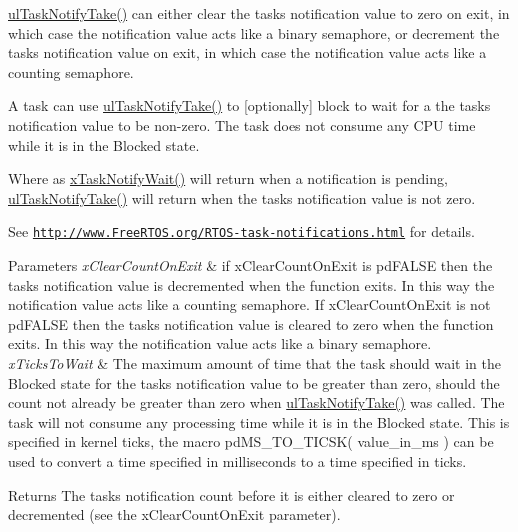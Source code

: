 \hyperlink{vendor_2ceedling_2plugins_2freertos_2src_2freertos_2include_2task_8h_a66540bef602522a01a519f776e4c07d8}{ul\+Task\+Notify\+Take()} can either clear the task\textquotesingle{}s notification value to zero on exit, in which case the notification value acts like a binary semaphore, or decrement the task\textquotesingle{}s notification value on exit, in which case the notification value acts like a counting semaphore.

A task can use \hyperlink{vendor_2ceedling_2plugins_2freertos_2src_2freertos_2include_2task_8h_a66540bef602522a01a519f776e4c07d8}{ul\+Task\+Notify\+Take()} to \mbox{[}optionally\mbox{]} block to wait for a the task\textquotesingle{}s notification value to be non-\/zero. The task does not consume any C\+PU time while it is in the Blocked state.

Where as \hyperlink{vendor_2ceedling_2plugins_2freertos_2src_2freertos_2include_2task_8h_a0475fcda9718f403521c270a7270ff93}{x\+Task\+Notify\+Wait()} will return when a notification is pending, \hyperlink{vendor_2ceedling_2plugins_2freertos_2src_2freertos_2include_2task_8h_a66540bef602522a01a519f776e4c07d8}{ul\+Task\+Notify\+Take()} will return when the task\textquotesingle{}s notification value is not zero.

See \href{http://www.FreeRTOS.org/RTOS-task-notifications.html}{\tt http\+://www.\+Free\+R\+T\+O\+S.\+org/\+R\+T\+O\+S-\/task-\/notifications.\+html} for details.


\begin{DoxyParams}{Parameters}
{\em x\+Clear\+Count\+On\+Exit} & if x\+Clear\+Count\+On\+Exit is pd\+F\+A\+L\+SE then the task\textquotesingle{}s notification value is decremented when the function exits. In this way the notification value acts like a counting semaphore. If x\+Clear\+Count\+On\+Exit is not pd\+F\+A\+L\+SE then the task\textquotesingle{}s notification value is cleared to zero when the function exits. In this way the notification value acts like a binary semaphore.\\
\hline
{\em x\+Ticks\+To\+Wait} & The maximum amount of time that the task should wait in the Blocked state for the task\textquotesingle{}s notification value to be greater than zero, should the count not already be greater than zero when \hyperlink{vendor_2ceedling_2plugins_2freertos_2src_2freertos_2include_2task_8h_a66540bef602522a01a519f776e4c07d8}{ul\+Task\+Notify\+Take()} was called. The task will not consume any processing time while it is in the Blocked state. This is specified in kernel ticks, the macro pd\+M\+S\+\_\+\+T\+O\+\_\+\+T\+I\+C\+S\+K( value\+\_\+in\+\_\+ms ) can be used to convert a time specified in milliseconds to a time specified in ticks.\\
\hline
\end{DoxyParams}
\begin{DoxyReturn}{Returns}
The task\textquotesingle{}s notification count before it is either cleared to zero or decremented (see the x\+Clear\+Count\+On\+Exit parameter). 
\end{DoxyReturn}
